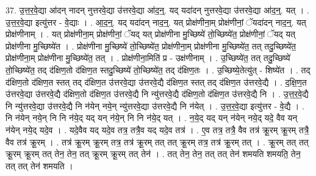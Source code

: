 \documentclass[17pt]{extarticle}
\begin{document}
37. उ॒त्त॒र॒वे॒द्या आ॑दन् नादन् नुत्तरवे॒द्या उ॑त्तरवे॒द्या आ॑द॒न्॒. यद् यदा॑दन् नुत्तरवे॒द्या उ॑त्तरवे॒द्या आ॑द॒न्॒. यत् । . उ॒त्त॒र॒वे॒द्या इत्यु॑त्तर - वे॒द्याः । . आ॒द॒न्॒. यद् यदा॑दन् नाद॒न्॒. यत् प्रोक्ष॑णीना॒म् प्रोक्ष॑णीनां॒ ॅयदा॑दन् नाद॒न्॒. यत् प्रोक्ष॑णीनाम् । . यत् प्रोक्ष॑णीना॒म् प्रोक्ष॑णीनां॒ ॅयद् यत् प्रोक्ष॑णीना मु॒च्छिष्ये॑ तो॒च्छिष्ये॑त॒ प्रोक्ष॑णीनां॒ ॅयद् यत् प्रोक्ष॑णीना मु॒च्छिष्ये॑त । . प्रोक्ष॑णीना मु॒च्छिष्ये॑ तो॒च्छिष्ये॑त॒ प्रोक्ष॑णीना॒म् प्रोक्ष॑णीना मु॒च्छिष्ये॑त॒ तत् तदु॒च्छिष्ये॑त॒ प्रोक्ष॑णीना॒म् प्रोक्ष॑णीना मु॒च्छिष्ये॑त॒ तत् । . प्रोक्ष॑णीना॒मिति॑ प्र - उक्ष॑णीनाम् । . उ॒च्छिष्ये॑त॒ तत् तदु॒च्छिष्ये॑ तो॒च्छिष्ये॑त॒ तद् द॑क्षिण॒तो द॑क्षिण॒त स्तदु॒च्छिष्ये॑ तो॒च्छिष्ये॑त॒ तद् द॑क्षिण॒तः । . उ॒च्छिष्ये॒तेत्यु॑त् - शिष्ये॑त । . तद् द॑क्षिण॒तो द॑क्षिण॒त स्तत् तद् द॑क्षिण॒त उ॑त्तरवे॒द्या उ॑त्तरवे॒द्यै द॑क्षिण॒त स्तत् तद् द॑क्षिण॒त उ॑त्तरवे॒द्यै । . द॒क्षि॒ण॒त उ॑त्तरवे॒द्या उ॑त्तरवे॒द्यै द॑क्षिण॒तो द॑क्षिण॒त उ॑त्तरवे॒द्यै नि न्यु॑त्तरवे॒द्यै द॑क्षिण॒तो द॑क्षिण॒त उ॑त्तरवे॒द्यै नि । . उ॒त्त॒र॒वे॒द्यै नि न्यु॑त्तरवे॒द्या उ॑त्तरवे॒द्यै नि न॑येन् नये॒न् न्यु॑त्तरवे॒द्या उ॑त्तरवे॒द्यै नि न॑येत् । . उ॒त्त॒र॒वे॒द्या इत्यु॑त्तर - वे॒द्यै । . नि न॑येन् नये॒न् नि नि न॑ये॒द् यद् यन् न॑ये॒न् नि नि न॑ये॒द् यत् । . न॒ये॒द् यद् यन् न॑येन् नये॒द् यदे॒ वैव यन् न॑येन् नये॒द् यदे॒व । . यदे॒वैव यद् यदे॒व तत्र॒ तत्रै॒व यद् यदे॒व तत्र॑ । . ए॒व तत्र॒ तत्रै॒ वैव तत्र॑ क्रू॒रम् क्रू॒रम् तत्रै॒ वैव तत्र॑ क्रू॒रम् । . तत्र॑ क्रू॒रम् क्रू॒रम् तत्र॒ तत्र॑ क्रू॒रम् तत् तत् क्रू॒रम् तत्र॒ तत्र॑ क्रू॒रम् तत् । . क्रू॒रम् तत् तत् क्रू॒रम् क्रू॒रम् तत् तेन॒ तेन॒ तत् क्रू॒रम् क्रू॒रम् तत् तेन॑ । . तत् तेन॒ तेन॒ तत् तत् तेन॑ शमयति शमयति॒ तेन॒ तत् तत् तेन॑ शमयति । \newline
\end{document}
